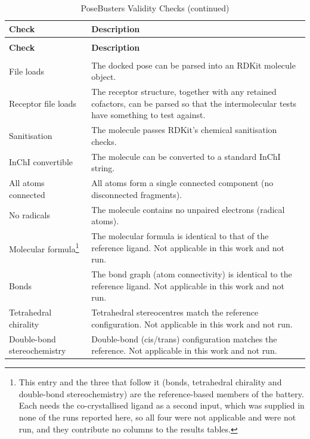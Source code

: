 \begin{longtable}[]{@{}
  >{\raggedright\arraybackslash}p{}
  >{\raggedright\arraybackslash}p{}@{}}
\caption{PoseBusters Validity Checks}\label{tab:appendix-posebusters-checks}\tabularnewline
\toprule\noalign{}
{\raggedright \textbf{Check}} & {\raggedright \textbf{Description}} \\
\midrule\noalign{}
\endfirsthead
\caption[]{PoseBusters Validity Checks (continued)}\tabularnewline
\toprule\noalign{}
{\raggedright \textbf{Check}} & {\raggedright \textbf{Description}} \\
\midrule\noalign{}
\endhead
\bottomrule\noalign{}
\endlastfoot
\multicolumn{2}{@{}l@{}}{%
\textbf{Chemical validity and consistency}} \\
File loads & The docked pose can be parsed into an RDKit molecule object. \\
Receptor file loads & The receptor structure, together with any retained cofactors, can be parsed so that the intermolecular tests have something to test against. \\
Sanitisation & The molecule passes RDKit's chemical sanitisation checks. \\
InChI convertible & The molecule can be converted to a standard InChI string. \\
All atoms connected & All atoms form a single connected component (no disconnected fragments). \\
No radicals & The molecule contains no unpaired electrons (radical atoms). \\
Molecular formula\footnote{This entry and the three that follow it (bonds, tetrahedral chirality and double-bond stereochemistry) are the reference-based members of the battery. Each needs the co-crystallised ligand as a second input, which was supplied in none of the runs reported here, so all four were not applicable and were not run, and they contribute no columns to the results tables.} & The molecular formula is identical to that of the reference ligand. Not applicable in this work and not run. \\
Bonds & The bond graph (atom connectivity) is identical to the reference ligand. Not applicable in this work and not run. \\
Tetrahedral chirality & Tetrahedral stereocentres match the reference configuration. Not applicable in this work and not run. \\
Double-bond stereochemistry & Double-bond (cis/trans) configuration matches the reference. Not applicable in this work and not run. \\

\end{longtable}
